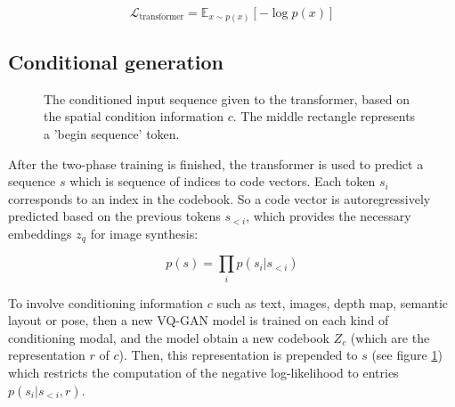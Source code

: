 \begin{equation*}
    \mathcal{L}_{\text{transformer}} = \mathbb{E}_{x \sim p(x)} [- \log p(x)]
\end{equation*}









\subsection{Conditional generation}

\begin{figure}
    \centering
    \caption{The conditioned input sequence given to the transformer, based on the spatial condition information $c$. The middle rectangle represents a 'begin sequence' token.}
    \label{fig:vqgan_conditional_generation}
\end{figure}


After the two-phase training is finished, the transformer is used to predict a sequence $s$ which is sequence of indices to code vectors. Each token $s_i$ corresponds to an index in the codebook. So a code vector is autoregressively predicted based on the previous tokens $s_{<i}$, which provides the necessary embeddings $z_q$ for image synthesis: 

\[ p(s) = \prod_{i} p(s_i | s_{<i}) \]

To involve conditioning information $c$ such as text, images, depth map, semantic layout or pose, then a new VQ-GAN model is trained on each kind of conditioning modal, and the model obtain a new codebook $Z_c$ (which are the representation $r$ of $c$). Then, this representation is prepended to $s$ (see figure \ref{fig:vqgan_conditional_generation}) which restricts the computation of the negative log-likelihood to entries $p(s_i | s_{<i}, r)$.








